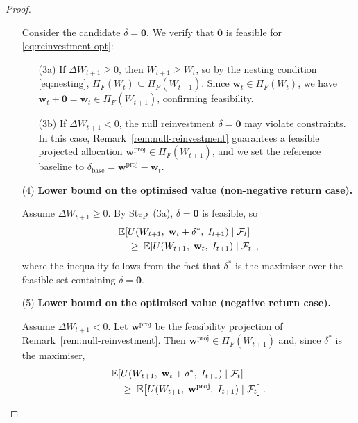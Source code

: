 \documentclass[12pt,openany]{book}
\newcommand{\bfw}{\mathbf{w}}
\newcommand{\calF}{\mathcal{F}}
\newcommand{\calI}{\mathcal{I}}
\newcommand{\E}{\mathbb{E}}
\numberwithin{equation}{chapter}
\theoremstyle{plain}
\theoremstyle{definition}
\theoremstyle{remark}
\numberwithin{equation}{chapter}
\theoremstyle{plain}
\def\calI{I}%
\begin{document}
\begin{proof}
\begin{enumerate}
        Consider the candidate $\delta = \mathbf{0}$.  We verify
        that $\mathbf{0}$ is feasible for \eqref{eq:reinvestment-opt}:
        \begin{enumerate}
          \item[\textup{(3a)}] If $\Delta W_{t+1} \geq 0$, then
                $W_{t+1} \geq W_t$, so by the nesting condition
                \eqref{eq:nesting},
                $\Pi_F(W_t) \subseteq \Pi_F(W_{t+1})$.
                Since $\bfw_t \in \Pi_F(W_t)$, we have
                $\bfw_t + \mathbf{0} = \bfw_t \in \Pi_F(W_{t+1})$,
                confirming feasibility.
          \item[\textup{(3b)}] If $\Delta W_{t+1} < 0$, the null
                reinvestment $\delta = \mathbf{0}$ may violate
                constraints.  In this case,
                Remark~\ref{rem:null-reinvestment} guarantees a
                feasible projected allocation $\bfw^{\mathrm{proj}}
                \in \Pi_F(W_{t+1})$, and we set the reference
                baseline to $\delta_{\mathrm{base}} =
                \bfw^{\mathrm{proj}} - \bfw_t$.
        \end{enumerate}

  \item[\textup{(4)}] \textbf{Lower bound on the optimised value
        (non-negative return case).}

        Assume $\Delta W_{t+1} \geq 0$.
        By Step~(3a), $\delta = \mathbf{0}$ is feasible, so
        \begin{align}
          &\E\!\left[
            U(W_{t+1},\; \bfw_t + \delta^*,\; \calI_{t+1})
            \mid \calF_t
          \right]
          \notag \\
          &\quad \geq\;
          \E\!\left[
            U(W_{t+1},\; \bfw_t,\; \calI_{t+1})
            \mid \calF_t
          \right],
          \label{eq:lb-nonneg}
        \end{align}
        where the inequality follows from the fact that $\delta^*$
        is the maximiser over the feasible set containing
        $\delta = \mathbf{0}$.

  \item[\textup{(5)}] \textbf{Lower bound on the optimised value
        (negative return case).}

        Assume $\Delta W_{t+1} < 0$.
        Let $\bfw^{\mathrm{proj}}$ be the feasibility projection
        of Remark~\ref{rem:null-reinvestment}.  Then
        $\bfw^{\mathrm{proj}} \in \Pi_F(W_{t+1})$ and, since
        $\delta^*$ is the maximiser,
        \begin{align}
          &\E\!\left[
            U(W_{t+1},\; \bfw_t + \delta^*,\; \calI_{t+1})
            \mid \calF_t
          \right]
          \notag \\
          &\quad \geq\;
          \E\!\left[
            U(W_{t+1},\; \bfw^{\mathrm{proj}},\; \calI_{t+1})
            \mid \calF_t
          \right].
          \label{eq:lb-neg}
        \end{align}


\end{enumerate}
\end{proof}
\end{document}
